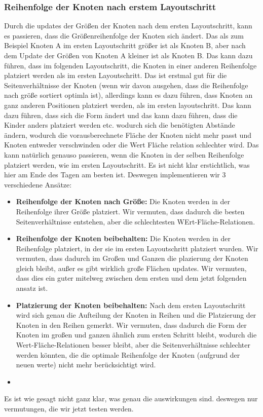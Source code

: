 \subsubsection{Reihenfolge der Knoten nach erstem Layoutschritt} \label{sec:ReihenfolgeKnotenErstesLayout}
Durch die updates der Größen der Knoten nach dem ersten Layoutschritt, kann es passieren, dass die Größenreihenfolge der Knoten sich ändert. Das als zum Beispiel Knoten A im ersten Layoutschritt größer ist als Knoten B, aber nach dem Update der Größen von Knoten A kleiner ist als Knoten B. Das kann dazu führen, dass im folgenden Layoutschritt, die Knoten in einer anderen Reihenfolge platziert werden als im ersten Layoutschritt. 
Das ist erstmal gut für die Seitenverhältnisse der Knoten (wenn wir davon ausgehen, dass die Reihenfolge nach größe sortiert optimla ist), allerdings kann es dazu führen, dass Knoten an ganz anderen Positionen platziert werden, als im ersten layoutschritt. Das  kann dazu führen, dass sich die Form ändert und das kann dazu führen, dass die Kinder anders platziert werden etc. wodurch sich die benötigten Abstände ändern, wodurch die vorausberechnete Fläche der Knoten nicht mehr passt und Knoten entweder verschwinden oder die Wert Fläche relation schlechter wird.
Das kann natürlich genauso passieren, wenn die Knoten in der selben Reihenfolge platziert werden, wie im ersten Layoutschritt. Es ist nicht klar erstichtlich, was hier am Ende des Tagen am besten ist. Deswegen implementieren wir 3 verschiedene Ansätze:
\begin{itemize}
    \item \textbf{Reihenfolge der Knoten nach Größe:} Die Knoten werden in der Reihenfolge ihrer Größe platziert. Wir vermuten, dass dadurch die besten Seitenverhältnisse entstehen, aber die schlechtesten WErt-Fläche-Relationen.
    \item \textbf{Reihenfolge der Knoten beibehalten:} Die Knoten werden in der Reihenfolge platziert, in der sie im ersten Layoutschritt platziert wurden. Wir vermuten, dass dadurch im Großen und Ganzen die plazierung der Knoten gleich bleibt, außer es gibt wirklich große Flächen updates. Wir vermuten, dass dies ein guter mitelweg zwischen dem ersten und dem jetzt folgenden ansatz ist.
    \item \textbf{Platzierung der Knoten beibehalten:} Nach dem ersten Layoutschritt wird sich genau die Aufteilung der Knoten in Reihen und die Platzierung der Knoten in den Reihen gemerkt. Wir vermuten, dass dadurch die Form der Knoten im großen und ganzen ähnlich zum ersten Schritt bleibt, wodurch die Wert-Fläche-Relationen besser bleibt, aber die Seitenverhältnisse schlechter werden könnten, die die optimale Reihenfolge der Knoten (aufgrund der neuen werte) nicht mehr berücksichtigt wird.
    \item 
\end{itemize} 
Es ist wie gesagt nicht ganz klar, was genau die auswirkungen sind. deswegen nur vermutungen, die wir jetzt testen werden.

